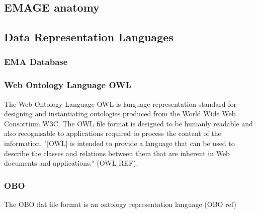 \subsection{EMAGE anatomy}
\subsection{Data Representation Languages}
\subsubsection{EMA Database}\label{emadb}
\subsubsection{Web Ontology Language OWL}\label{owl}
The Web Ontology Language OWL is language representation standard for designing and instantiating ontologies produced from the World Wide Web Consortium W3C. The OWL file format is designed to be humanly readable and also recognisable to applications required to process the content of the information. "[OWL] is intended to provide a language that can be used to describe the classes and relations between them that are inherent in Web documents and applications." (OWL REF). 
\subsubsection{OBO}\label{obo}
The OBO flat file format is an ontology representation language (OBO ref)

